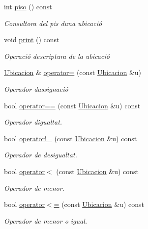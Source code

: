 \begin{DoxyCompactItemize}
int \hyperlink{class_ubicacion_af6099f8de4dee993e4c9119e1f879070}{piso} () const
\begin{DoxyCompactList}\small\item\em Consultora del pis d\textquotesingle{}una ubicació \end{DoxyCompactList}\item 
void \hyperlink{class_ubicacion_a6b693a32d8bbd9afce30b11d19b68846}{print} () const
\begin{DoxyCompactList}\small\item\em Operació d\textquotesingle{}escriptura de la ubicació \end{DoxyCompactList}\item 
\hyperlink{class_ubicacion}{Ubicacion} \& \hyperlink{class_ubicacion_a4260739b394ef1981040a4925a80c469}{operator=} (const \hyperlink{class_ubicacion}{Ubicacion} \&u)
\begin{DoxyCompactList}\small\item\em Operador d\textquotesingle{}assignació \end{DoxyCompactList}\item 
bool \hyperlink{class_ubicacion_a4fd8b3d7d42695cc4852771e34ab63bc}{operator==} (const \hyperlink{class_ubicacion}{Ubicacion} \&u) const
\begin{DoxyCompactList}\small\item\em Operador d\textquotesingle{}igualtat. \end{DoxyCompactList}\item 
bool \hyperlink{class_ubicacion_a5caac27fa52a8e5fddd5ab50b0d56bd1}{operator!=} (const \hyperlink{class_ubicacion}{Ubicacion} \&u) const
\begin{DoxyCompactList}\small\item\em Operador de desigualtat. \end{DoxyCompactList}\item 
bool \hyperlink{class_ubicacion_a4d19b7ea907107a1c25677c3785a0a69}{operator$<$} (const \hyperlink{class_ubicacion}{Ubicacion} \&u) const
\begin{DoxyCompactList}\small\item\em Operador de menor. \end{DoxyCompactList}\item 
bool \hyperlink{class_ubicacion_ac3b54c312d4e2e01c6bda1205b39ae3b}{operator$<$=} (const \hyperlink{class_ubicacion}{Ubicacion} \&u) const
\begin{DoxyCompactList}\small\item\em Operador de menor o igual. \end{DoxyCompactList}\item 

\end{DoxyCompactItemize}
